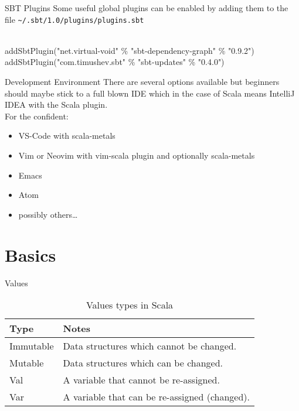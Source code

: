 \documentclass[10pt]{beamer}
\begin{document}
  \begin{frame}{SBT Plugins}
    Some useful global plugins can be enabled by adding them to the file
    \texttt{\~{}/.sbt/1.0/plugins/plugins.sbt}\\
    \begin{texttt}
      \\
      addSbtPlugin("net.virtual-void" \% "sbt-dependency-graph" \% "0.9.2")\\
      addSbtPlugin("com.timushev.sbt" \% "sbt-updates"          \% "0.4.0")
    \end{texttt}
  \end{frame}

  \begin{frame}{Development Environment}
    There are several options available but beginners should maybe stick
    to a full blown IDE which in the case of Scala means IntelliJ IDEA
    with the Scala plugin.\\
    For the confident:
    \begin{itemize}
      \item VS-Code with scala-metals
      \item Vim or Neovim with vim-scala plugin and optionally scala-metals
      \item Emacs
      \item Atom
      \item possibly others\ldots
    \end{itemize}
  \end{frame}

  \section{Basics}
  \begin{frame}{Values}
    \begin{table}
      \caption{Values types in Scala}
      \begin{tabular}{@{} ll @{}}
	\toprule
	Type & Notes\\
	\midrule
	Immutable & Data structures which cannot be changed.\\
	Mutable & Data structures which can be changed.\\
	Val & A variable that cannot be re-assigned.\\
	Var & A variable that can be re-assigned (changed).\\
	\bottomrule
      \end{tabular}
    \end{table}
  \end{frame}
\end{document}
